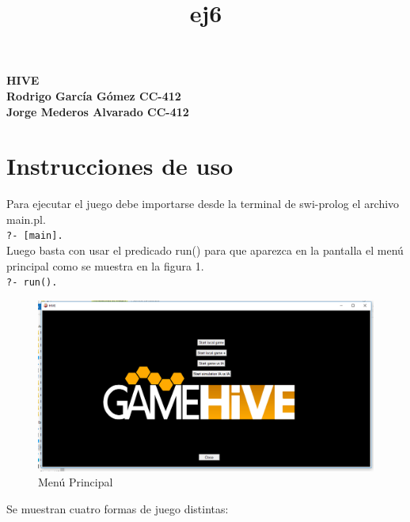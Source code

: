 \documentclass[a4paper,12pt]{article}
\begin{document}
 

\title{ej6}

\begin{titlepage}
\centering
\vspace*{\fill}
\vspace*{0.5cm}
\huge\bfseries
HIVE\\
\vspace*{0.5cm}
\large Rodrigo García Gómez CC-412 \\ Jorge Mederos Alvarado CC-412
\vspace*{\fill}
\end{titlepage}


\section*{Instrucciones de uso}
Para ejecutar el juego debe importarse desde la terminal de swi-prolog el archivo main.pl.\\

\texttt{?- [main].} \\

Luego basta con usar el predicado run() para que aparezca en la pantalla el menú principal como se muestra en la figura 1.\\

\texttt{?- run().}\\

\begin{figure}[H]
	\centering
	\includegraphics[width=0.9\linewidth]{./1}
	\caption{Menú Principal}
	\label{fig:1}
\end{figure}

Se muestran cuatro formas de juego distintas:
\end{document}

